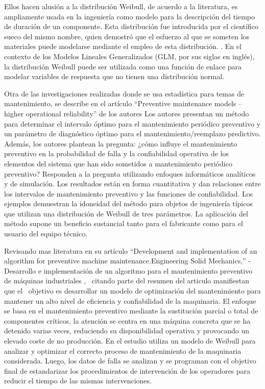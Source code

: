 \documentclass[
  11pt,
  bookmarksnumbered]{article}
\begin{document}
Ellos hacen alusión a la distribución Weibull, de acuerdo a la literatura, es ampliamente usada en la ingeniería como modelo para la descripción del tiempo de duración de un componente.
Esta distribución fue introducida por el científico sueco del mismo nombre, quien demostró que el esfuerzo al que se someten los materiales puede modelarse mediante el empleo de esta distribución.
\textcite{Castaneda2004}.
En el contexto de los Modelos Lineales Generalizados (GLM, por sus siglas en inglés), la distribución Weibull puede ser utilizada como una función de enlace para modelar variables de respuesta que no tienen una distribución normal.

Otra de las investigaciones realizadas donde se usa estadística para temas de mantenimiento, se describe en el artículo ``Preventive maintenance models -- higher operational reliability'' de los autores \textcite{Legat2017} Los autores presentan un método para determinar el intervalo óptimo para el mantenimiento periódico preventivo y un parámetro de diagnóstico óptimo para el mantenimiento/reemplazo predictivo.
Además, los autores plantean la pregunta: ¿cómo influye el mantenimiento preventivo en la probabilidad de falla y la confiabilidad operativa de los elementos del sistema que han sido sometidos a mantenimiento periódico preventivo?
Responden a la pregunta utilizando enfoques informáticos analíticos y de simulación.
Los resultados están en forma cuantitativa y dan relaciones entre los intervalos de mantenimiento preventivo y las funciones de confiabilidad.
Los ejemplos demuestran la idoneidad del método para objetos de ingeniería típicos que utilizan una distribución de Weibull de tres parámetros.
La aplicación del método supone un beneficio sustancial tanto para el fabricante como para el usuario del equipo técnico.

Revisando mas literatura \textcite{Nardo2021} en su artículo ``Development and implementation of an algorithm for preventive machine maintenance.Engineering Solid Mechanics,'' -Desarrollo e implementación de un algoritmo para el mantenimiento preventivo de máquinas industriales ,~ citando parte del resumen del articulo manifiestan que el ~objetivo es desarrollar un modelo de optimización del mantenimiento para mantener un alto nivel de eficiencia y confiabilidad de la maquinaria.
El enfoque se basa en el mantenimiento preventivo mediante la sustitución parcial o total de componentes críticos, la atención se centra en una máquina concreta que se ha detenido varias veces, reduciendo su disponibilidad operativa y provocando un elevado coste de no producción.
En el estudio utiliza un modelo de Weibull para analizar y optimizar el correcto proceso de mantenimiento de la maquinaria considerada.
Luego, los datos de falla se analizan y se programan con el objetivo final de estandarizar los procedimientos de intervención de los operadores para reducir el tiempo de las mismas intervenciones.
\end{document}
